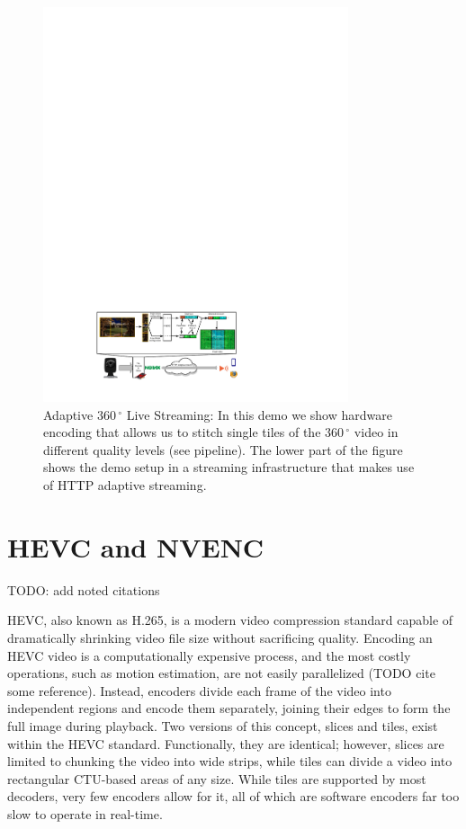 \renewcommand{\figurename}{Fig.}
\begin{figure}[t]
	\centering
	\includegraphics[width=0.8\textwidth]{figures/Streaming_scenario_v3.pdf}
	\caption{Adaptive $360\,^{\circ}$ Live Streaming: In this demo we show hardware encoding that allows us to stitch single tiles of the $360\,^{\circ}$ video in different quality levels (see pipeline). The lower part of the figure shows the demo setup in a streaming infrastructure that makes use of HTTP adaptive streaming.}
	\label{fig:pipeline}
\end{figure}

\section{HEVC and NVENC} \label{hevc}

TODO: add noted citations

HEVC, also known as H.265, is a modern video compression standard capable of dramatically shrinking video file size without sacrificing quality. Encoding an HEVC video is a computationally expensive process, and the most costly operations, such as motion estimation, are not easily parallelized (TODO cite some reference). Instead, encoders divide each frame of the video into independent regions and encode them separately, joining their edges to form the full image during playback. Two versions of this concept, slices and tiles, exist within the HEVC standard. Functionally, they are identical; however, slices are limited to chunking the video into wide strips, while tiles can divide a video into rectangular CTU-based areas of any size. While tiles are supported by most decoders, very few encoders allow for it, all of which are software encoders far too slow to operate in real-time.

